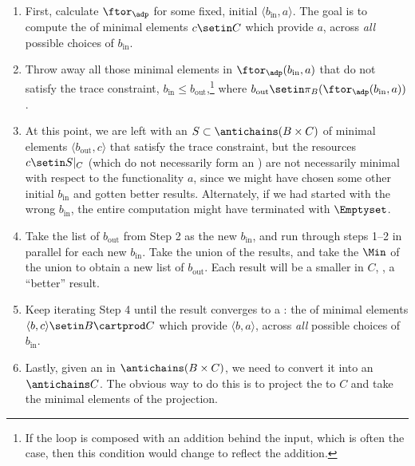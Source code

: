 \begin{enumerate}
    \item First, calculate $\ftor_\adp$ for some fixed, initial $\langle b_{\text{in}},a \rangle$.
          The goal is to compute the  of minimal elements $c \setin C$ which provide $a$, across \emph{all} possible choices of $b_{\text{in}}$.
    \item Throw away all those minimal elements in $\ftor_\adp(b_{\text{in}},a)$ that do not satisfy the trace constraint, $b_{\text{in}} \leq b_{\text{out}}$,\footnote{If the loop is composed with an addition behind the input, which is often the case, then this condition would change to reflect the addition.} where $b_{\text{out}} \setin \pi_B(\ftor_\adp(b_{\text{in}},a))$.
    \item At this point, we are left with an  $S \subset \antichains (B \times C)$ of minimal elements $\langle b_{\text{out}},c \rangle$ that satisfy the trace constraint, but the resources $c \setin S|_C$ (which do not necessarily form an ) are not necessarily minimal with respect to the functionality $a$, since we might have chosen some other initial $b_{\text{in}}$ and gotten better results.
          Alternately, if we had started with the wrong $b_{\text{in}}$, the entire computation might have terminated with $\Emptyset$.
    \item Take the list of $b_{\text{out}}$ from Step 2 as the new $b_{\text{in}}$, and run through steps 1--2 in parallel for each new $b_{\text{in}}$.
          Take the union of the results, and take the $\Min$ of the union to obtain a new list of $b_{\text{out}}$.
          Each result will be a smaller  in $C$, \ie,  a ``better'' result.
    \item Keep iterating Step 4 until the result converges to a : the  of minimal elements $\langle b, c \rangle \setin B \cartprod C$ which provide $\langle b, a \rangle$, across \emph{all} possible choices of $b_{\text{in}}$.
    \item Lastly, given an  in $\antichains (B\times C)$, we need to convert it into an  $\antichains C$.
          The obvious way to do this is to project the  to $C$ and take the minimal elements of the projection.

\end{enumerate}
